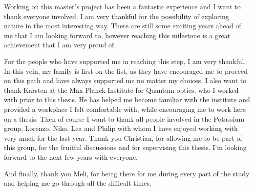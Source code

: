 
Working on this master's project has been a fantastic experience and I want to thank everyone involved. I am very thankful for the possibility of exploring nature in the most interesting way. There are still some exciting years ahead of me that I am looking forward to, however reaching this milestone is a great achievement that I am very proud of.

For the people who have supported me in reaching this step, I am very thankful. In this vein, my family is first on the list, as they have encouraged me to proceed on this path and have always supported me no matter my choices. I also want to thank Karsten at the Max Planck Institute for Quantum optics, who I worked with prior to this thesis. He has helped me become familiar with the institute and provided a workplace I felt comfortable with, while encouraging me to work here on a thesis.
Then of course I want to thank all people involved in the Potassium group, Lorenzo, Niko, Lea and Philip with whom I have enjoyed working with very much for the last year. Thank you Christian, for allowing me to be part of this group, for the fruitful discussions and for supervising this thesis. I'm looking forward to the next few years with everyone.

And finally, thank you Meli, for being there for me during every part of the study and helping me go through all the difficult times.
